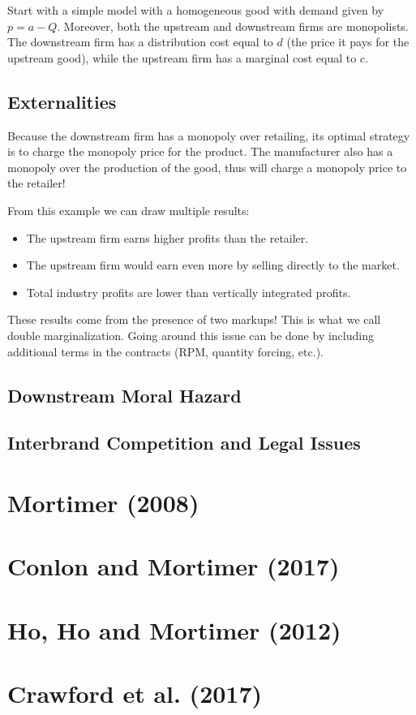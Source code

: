 Start with a simple model with a homogeneous good with demand given by $p = a - Q$. Moreover, both the upstream and downstream firms are monopolists. The downstream firm has a distribution cost equal to $d$ (the price it pays for the upstream good), while the upstream firm has a marginal cost equal to $c$.

\subsection{Externalities}

Because the downstream firm has a monopoly over retailing, its optimal strategy is to charge the monopoly price for the product. The manufacturer also has a monopoly over the production of the good, thus will charge a monopoly price to the retailer! 

From this example we can draw multiple results: \begin{itemize}
\item The upstream firm earns higher profits than the retailer.
\item The upstream firm would earn even more by selling directly to the market.
\item Total industry profits are lower than vertically integrated profits.
\end{itemize}
These results come from the presence of two markups! This is what we call double marginalization. Going around this issue can be done by including additional terms in the contracts (RPM, quantity forcing, etc.).



\subsection{Downstream Moral Hazard}



\subsection{Interbrand Competition and Legal Issues}



\section{Mortimer (2008)}



\section{Conlon and Mortimer (2017)}



\section{Ho, Ho and Mortimer (2012)}



\section{Crawford et al. (2017)}

